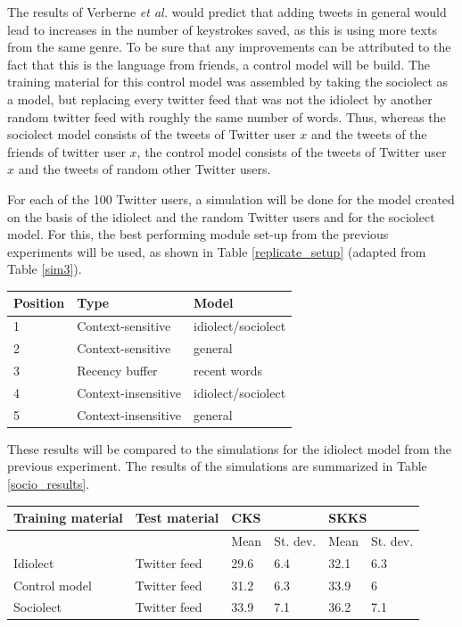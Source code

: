 \documentclass[11pt]{article}
\let\originaltable\table
\let\endoriginaltable\endtable
\renewenvironment{table}[1][ht]{%
  \originaltable[#1]
  \centering}%
  {\endoriginaltable}
\begin{document}
The results of Verberne {\em et al.}  would predict that adding tweets in general would lead to increases in the number of keystrokes saved, as this is using more texts from the same genre. To be sure that any improvements can be attributed to the fact that this is the language from friends, a control model will be build. The training material for this control model was assembled by taking the sociolect as a model, but replacing every twitter feed that was not the idiolect by another random twitter feed with roughly the same number of words. Thus, whereas the sociolect model consists of the tweets of Twitter user $x$ and the tweets of the friends of twitter user $x$, the control model consists of the tweets of Twitter user $x$ and the tweets of random other Twitter users.

For each of the 100 Twitter users, a simulation will be done for the model created on the basis of the idiolect and the random Twitter users and for the sociolect model. For this, the best performing module set-up from the previous experiments will be used, as shown in Table \ref{replicate_setup} (adapted from Table \ref{sim3}).

\begin{table}[H]
\begin{tabular}{lll} 
Position&Type&Model\\
\hline
1&Context-sensitive&idiolect/sociolect\\
2&Context-sensitive&general\\
3&Recency buffer&recent words\\
4&Context-insensitive&idiolect/sociolect\\
5&Context-insensitive&general\\
\end{tabular} 
\caption{The best performing module set-up} \label{replicate_setup}
\end{table}

These results will be compared to the simulations for the idiolect model from the previous experiment. The results of the simulations are summarized in Table \ref{socio_results}.

\begin{table}[H] 
\centering
\begin{tabular}{ll|llll} 
Training material&Test material&\multicolumn{2}{l}{CKS}&\multicolumn{2}{l}{SKKS}\\
\hline
&&Mean&St. dev.&Mean&St. dev.\\
Idiolect&Twitter feed&29.6&6.4&32.1&6.3\\
Control model&Twitter feed&31.2&6.3&33.9&6\\
Sociolect&Twitter feed&33.9&7.1&36.2&7.1\\
\end{tabular} 
\caption{Mean percentage of keystrokes saved when using an idiolect, a control model (consisting of an idiolect and random other Twitter feeds) and a sociolect.} \label{socio_results}
\end{table}
\end{document}
